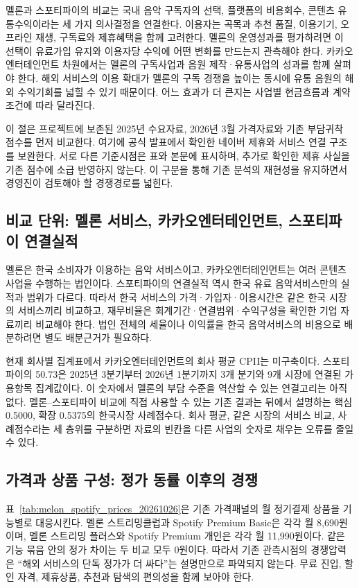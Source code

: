 \documentclass[11pt,a4paper]{report}
\begin{document}
멜론과 스포티파이의 비교는 국내 음악 구독자의 선택, 플랫폼의 비용회수, 콘텐츠 유통수익이라는 세 가지 의사결정을 연결한다. 이용자는 곡목과 추천 품질, 이용기기, 오프라인 재생, 구독료와 제휴혜택을 함께 고려한다. 멜론의 운영성과를 평가하려면 이 선택이 유료가입 유지와 이용자당 수익에 어떤 변화를 만드는지 관측해야 한다. 카카오엔터테인먼트 차원에서는 멜론의 구독사업과 음원 제작·유통사업의 성과를 함께 살펴야 한다. 해외 서비스의 이용 확대가 멜론의 구독 경쟁을 높이는 동시에 유통 음원의 해외 수익기회를 넓힐 수 있기 때문이다. 어느 효과가 더 큰지는 사업별 현금흐름과 계약조건에 따라 달라진다.

이 절은 프로젝트에 보존된 2025년 수요자료, 2026년 3월 가격자료와 기존 부담귀착 점수를 먼저 비교한다. 여기에 공식 발표에서 확인한 네이버 제휴와 서비스 연결 구조를 보완한다. 서로 다른 기준시점은 표와 본문에 표시하며, 추가로 확인한 제휴 사실을 기존 점수에 소급 반영하지 않는다. 이 구분을 통해 기존 분석의 재현성을 유지하면서 경영진이 검토해야 할 경쟁경로를 넓힌다.

\subsection{비교 단위: 멜론 서비스, 카카오엔터테인먼트, 스포티파이 연결실적}

멜론은 한국 소비자가 이용하는 음악 서비스이고, 카카오엔터테인먼트는 여러 콘텐츠 사업을 수행하는 법인이다. 스포티파이의 연결실적 역시 한국 유료 음악서비스만의 실적과 범위가 다르다. 따라서 한국 서비스의 가격·가입자·이용시간은 같은 한국 시장의 서비스끼리 비교하고, 재무비율은 회계기간·연결범위·수익구성을 확인한 기업 자료끼리 비교해야 한다. 법인 전체의 세율이나 이익률을 한국 음악서비스의 비용으로 배분하려면 별도 배분근거가 필요하다.

현재 회사별 집계표에서 카카오엔터테인먼트의 회사 평균 CPII는 미구축이다. 스포티파이의 50.73은 2025년 3분기부터 2026년 1분기까지 3개 분기와 9개 시장에 연결된 가용항목 집계값이다. 이 숫자에서 멜론의 부담 수준을 역산할 수 있는 연결고리는 아직 없다. 멜론--스포티파이 비교에 직접 사용할 수 있는 기존 결과는 뒤에서 설명하는 핵심 0.5000, 확장 0.5375의 한국시장 사례점수다. 회사 평균, 같은 시장의 서비스 비교, 사례점수라는 세 층위를 구분하면 자료의 빈칸을 다른 사업의 숫자로 채우는 오류를 줄일 수 있다.

\subsection{가격과 상품 구성: 정가 동률 이후의 경쟁}

표~\ref{tab:melon_spotify_prices_20261026}은 기존 가격패널의 월 정기결제 상품을 기능별로 대응시킨다. 멜론 스트리밍클럽과 Spotify Premium Basic은 각각 월 8,690원이며, 멜론 스트리밍 플러스와 Spotify Premium 개인은 각각 월 11,990원이다. 같은 기능 묶음 안의 정가 차이는 두 비교 모두 0원이다. 따라서 기존 관측시점의 경쟁압력은 ``해외 서비스의 단독 정가가 더 싸다''는 설명만으로 파악되지 않는다. 무료 진입, 할인 자격, 제휴상품, 추천과 탐색의 편의성을 함께 보아야 한다.
\end{document}
